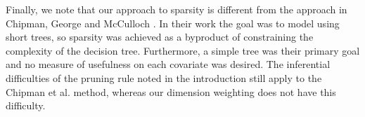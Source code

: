 Finally, we note that our approach to sparsity is different from the approach in Chipman, George and McCulloch \cite{chipman2000hierarchical}. In their work the goal was to model using short trees, so sparsity was achieved as a byproduct of constraining the complexity of the decision tree. Furthermore, a simple tree was their primary goal and no measure of usefulness on each covariate was desired. The inferential difficulties of the pruning rule noted in the introduction still apply to the Chipman et al. \cite{chipman2000hierarchical} method, whereas our dimension weighting does not have this difficulty. 


\newpage
